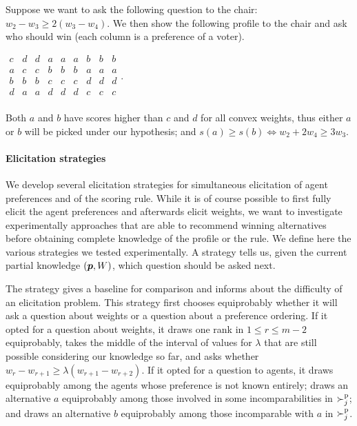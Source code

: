 \documentclass{article}
\begin{document}
\begin{example*}
	Suppose we want to ask the following question to the chair: $w_{2} - w_{3} ≥ 2 (w_{3} - w_{4})$. 
	We then show the following profile to the chair and ask who should win (each column is a preference of a voter).
	\begin{center}
		$
		\begin{array}{ccccccccc}
			c&d&d&a&a&a&b&b&b\\
			a&c&c&b&b&b&a&a&a\\
			b&b&b&c&c&c&d&d&d\\
			d&a&a&d&d&d&c&c&c\\
		\end{array}.
		$
	\end{center}
	Both $a$ and $b$ have scores higher than $c$ and $d$ for all convex weights, thus either $a$ or $b$ will be picked under our hypothesis; and $s(a) ≥ s(b) ⇔ w_2 + 2 w_4 ≥ 3 w_3$.
\end{example*}

\paragraph{Elicitation strategies}
We develop several elicitation strategies for simultaneous elicitation of agent preferences and of the scoring rule.
While it is of course possible to first fully elicit the agent preferences and afterwards elicit weights, we want to investigate experimentally approaches that are able to recommend winning alternatives before obtaining complete knowledge of the profile or the rule.
We define here the various strategies we tested experimentally. A strategy tells us, given the current partial knowledge $({\bm{p}}, W)$, which question should be asked next.

The  strategy gives a baseline for comparison and informs about the difficulty of an elicitation problem. 
This strategy first chooses equiprobably whether it will ask a question about weights or a question about a preference ordering. If it opted for a question about weights, it draws one rank in $1 ≤ r ≤ m-2$ equiprobably, takes the middle of the interval of values for $\lambda$ that are still possible considering our knowledge so far, and asks whether $w_r - w_{r+1} ≥ \lambda (w_{r+1} - w_{r+2})$.
If it opted for a question to agents, it draws equiprobably among the agents whose preference is not known entirely; draws an alternative $a$ equiprobably among those involved in some incomparabilities in $\succ^\text{p}_j$; and draws an alternative $b$ equiprobably among those incomparable with $a$ in $\succ^\text{p}_j$.
\end{document}
